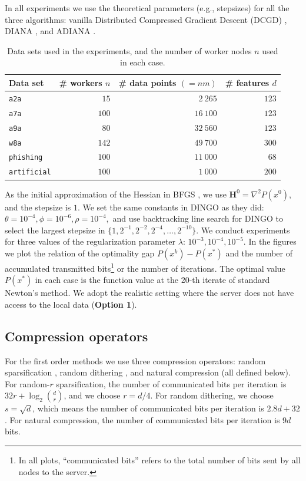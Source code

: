 \documentclass[12pt]{article}
\newcommand{\mH}{\mathbf{H}}
\begin{document}
In all experiments we use the theoretical parameters (e.g., stepsizes) for all the three algorithms: vanilla Distributed Compressed Gradient Descent (DCGD) \citep{KFJ}, DIANA \citep{DIANA}, and ADIANA \citep{ADIANA}. 

\begin{table}[h]
	\caption{Data sets used in the experiments, and the number of worker nodes $n$ used in each case.}
	\label{table1}
	\begin{center}
		\begin{tabular}{| l | r | r | r |}
			\toprule
			{\bf Data set}  & \bf \# workers $n$ &{\bf \# data points} $(=nm)$ & \bf\# features $d$ \\
			\midrule 
			{\tt a2a} & $15$ & $2~265$ & $123$\\ \hline
			{\tt a7a} & $100$ & $16~100$ & $123$\\ \hline
			{\tt a9a} & $80$ & $32~560$ & $123$\\ \hline
			{\tt w8a} & $142$ & $49~700$ & $300$\\ \hline
			{\tt phishing} & $100$ & $11~000$ & $68$\\ \hline
			{\tt artificial} & $100$ & $1~000$ & $200$\\
			\bottomrule
		\end{tabular}
	\end{center}
\end{table}


As the initial approximation of the Hessian in BFGS \citep{Broyden1967, Fletcher1970, Goldfarb1970, shanno1970conditioning}, we use $\mH^0 = \nabla^2P(x^0)$, and the stepsize is $1$. We set the same constants in DINGO \citep{DINGO2019} as they did: $\theta=10^{-4}, \phi=10^{-6}, \rho=10^{-4},$ and use backtracking line search for DINGO to select the largest stepsize in $\{1, 2^{-1}, 2^{-2}, 2^{-4},\dots, 2^{-10}\}$. We conduct experiments for three values of the regularization parameter $\lambda$: $10^{-3}, 10^{-4}, 10^{-5}$.  
In the figures we plot the relation of the optimality gap $P(x^k) - P(x^*)$ and the number of accumulated transmitted bits\footnote{In all plots, ``communicated bits'' refers to the total number of bits sent by all nodes to the server.} or the number of iterations. The optimal value $P(x^*)$ in each case is the function value at the $20$-th iterate of standard Newton's method.  We adopt the realistic setting where the server does not have access to the local data ({\bf Option 1}).



\subsection{Compression operators} For the first order methods we use three compression operators: random sparsification \citep{stich2018sparsified}, random dithering \citep{Alistarh17}, and natural compression \citep{Cnat} (all defined below).
For random-$r$ sparsification, the number of communicated  bits per iteration is $32r+\log_2{\binom{d}{r}}$, and we choose $r = d/4$. For random dithering, we choose $s = \sqrt{d}$, which means the
number of communicated bits per iteration is $2.8d + 32$. For natural compression, the number of communicated bits per iteration is $9d$ bits. 
\end{document}
